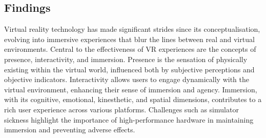 \subsection{Findings}
\label{sec:findings}
Virtual reality technology has made significant strides since its conceptualisation, evolving into immersive experiences that blur the lines between real and virtual environments. 
Central to the effectiveness of VR experiences are the concepts of presence, interactivity, and immersion. 
Presence is the sensation of physically existing within the virtual world, influenced both by subjective perceptions and objective indicators. 
Interactivity allows users to engage dynamically with the virtual environment, enhancing their sense of immersion and agency. 
Immersion, with its cognitive, emotional, kinesthetic, and spatial dimensions, contributes to a rich user experience across various platforms. 
Challenges such as simulator sickness highlight the importance of high-performance hardware in maintaining immersion and preventing adverse effects. 





